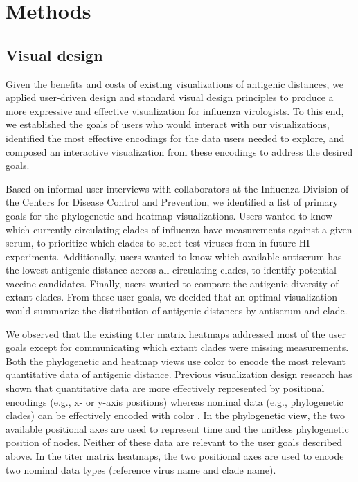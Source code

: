 \documentclass[utf8]{FrontiersinHarvard} %
\begin{document}
\section{Methods}

\subsection{Visual design}

Given the benefits and costs of existing visualizations of antigenic distances, we applied user-driven design and standard visual design principles to produce a more expressive and effective visualization for influenza virologists.
To this end, we established the goals of users who would interact with our visualizations, identified the most effective encodings for the data users needed to explore, and composed an interactive visualization from these encodings to address the desired goals.

Based on informal user interviews with collaborators at the Influenza Division of the Centers for Disease Control and Prevention, we identified a list of primary goals for the phylogenetic and heatmap visualizations.
Users wanted to know which currently circulating clades of influenza have measurements against a given serum, to prioritize which clades to select test viruses from in future HI experiments.
Additionally, users wanted to know which available antiserum has the lowest antigenic distance across all circulating clades, to identify potential vaccine candidates.
Finally, users wanted to compare the antigenic diversity of extant clades.
From these user goals, we decided that an optimal visualization would summarize the distribution of antigenic distances by antiserum and clade.

We observed that the existing titer matrix heatmaps addressed most of the user goals except for communicating which extant clades were missing measurements.
Both the phylogenetic and heatmap views use color to encode the most relevant quantitative data of antigenic distance.
Previous visualization design research has shown that quantitative data are more effectively represented by positional encodings (e.g., x- or y-axis positions) whereas nominal data (e.g., phylogenetic clades) can be effectively encoded with color \citep{Mackinlay1986}.
In the phylogenetic view, the two available positional axes are used to represent time and the unitless phylogenetic position of nodes.
Neither of these data are relevant to the user goals described above.
In the titer matrix heatmaps, the two positional axes are used to encode two nominal data types (reference virus name and clade name).
\end{document}
